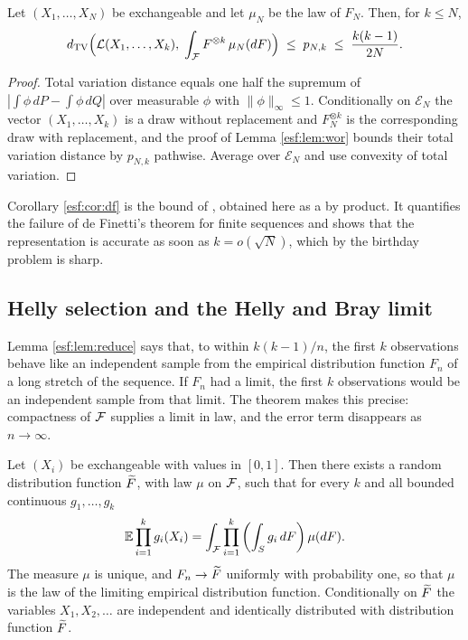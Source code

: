 \begin{corollary}
\label{esf:cor:df}
Let $(X_1,\dots,X_N)$ be exchangeable and let $\mu_N$ be the law of $F_N$. Then, for
$k \le N$,
\[
d_{\mathrm{TV}} \Bigl( \mathcal{L}(X_1,\dots,X_k), \;
\int_{\mathcal{F}} F^{\otimes k} \, \mu_N(dF) \Bigr) \; \le \; p_{N,k}
\; \le \; \frac{k(k-1)}{2N} .
\]
\end{corollary}

\begin{proof}
Total variation distance equals one half the supremum of $|\int \phi \, dP -
\int \phi \, dQ|$ over measurable $\phi$ with $\|\phi\|_\infty \le 1$. Conditionally on
$\mathcal{E}_N$ the vector $(X_1,\dots,X_k)$ is a draw without replacement and
$F_N^{\otimes k}$ is the corresponding draw with replacement, and the proof of Lemma
\ref{esf:lem:wor} bounds their total variation distance by $p_{N,k}$ pathwise. Average
over $\mathcal{E}_N$ and use convexity of total variation.
\end{proof}

Corollary \ref{esf:cor:df} is the bound of \citet{esf:diaconis1980}, obtained here as
a by product. It quantifies the failure of de Finetti's theorem for finite sequences
and shows that the representation is accurate as soon as $k = o(\sqrt{N})$, which by
the birthday problem is sharp.

\subsection{Helly selection and the Helly and Bray limit}
\label{esf:sec:helly}

Lemma \ref{esf:lem:reduce} says that, to within $k(k-1)/n$, the first $k$ observations
behave like an independent sample from the empirical distribution function $F_n$ of
a long stretch of the sequence. If $F_n$ had a limit, the first $k$ observations would
be an independent sample from that limit. The theorem makes this precise: compactness
of $\mathcal{F}$ supplies a limit in law, and the error term disappears as $n \to \infty$.

\begin{theorem}
\label{esf:thm:definetti}
Let $(X_i)$ be exchangeable with values in $[0,1]$. Then there exists a random
distribution function $\widetilde{F}$, with law $\mu$ on $\mathcal{F}$, such that for every $k$ and
all bounded continuous $g_1,\dots,g_k$
\begin{equation}
\mathbb{E} \prod_{i=1}^{k} g_i(X_i)
= \int_{\mathcal{F}} \prod_{i=1}^{k} \left( \int_S g_i \, dF \right) \mu(dF).
\label{esf:eq:definetti}
\end{equation}
The measure $\mu$ is unique, and $F_n \to \widetilde{F}$ uniformly with probability one, so
that $\mu$ is the law of the limiting empirical distribution function. Conditionally on
$\widetilde{F}$ the variables $X_1, X_2, \dots$ are independent and identically distributed
with distribution function $\widetilde{F}$.
\end{theorem}

